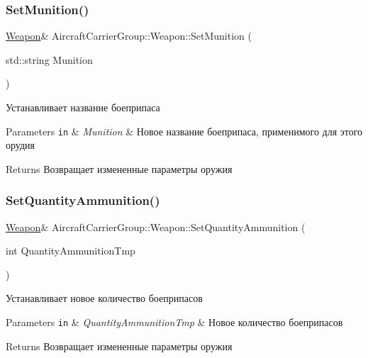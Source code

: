 \subsubsection{\texorpdfstring{Set\+Munition()}{SetMunition()}}
{\footnotesize\ttfamily \mbox{\hyperlink{class_aircraft_carrier_group_1_1_weapon}{Weapon}}\& Aircraft\+Carrier\+Group\+::\+Weapon\+::\+Set\+Munition (\begin{DoxyParamCaption}\item[{std\+::string}]{Munition }\end{DoxyParamCaption})\hspace{0.3cm}{\ttfamily [inline]}}



Устанавливает название боеприпаса 


\begin{DoxyParams}[1]{Parameters}
\mbox{\tt in}  & {\em Munition} & Новое название боеприпаса, применимого для этого орудия \\
\hline
\end{DoxyParams}
\begin{DoxyReturn}{Returns}
Возвращает измененные параметры оружия 
\end{DoxyReturn}
\mbox{\label{class_aircraft_carrier_group_1_1_weapon_a9fd2fbb263336abbbc9d12c51a9de3c1}} 
\subsubsection{\texorpdfstring{Set\+Quantity\+Ammunition()}{SetQuantityAmmunition()}}
{\footnotesize\ttfamily \mbox{\hyperlink{class_aircraft_carrier_group_1_1_weapon}{Weapon}}\& Aircraft\+Carrier\+Group\+::\+Weapon\+::\+Set\+Quantity\+Ammunition (\begin{DoxyParamCaption}\item[{int}]{Quantity\+Ammunition\+Tmp }\end{DoxyParamCaption})\hspace{0.3cm}{\ttfamily [inline]}}



Устанавливает новое количество боеприпасов 


\begin{DoxyParams}[1]{Parameters}
\mbox{\tt in}  & {\em Quantity\+Ammunition\+Tmp} & Новое количество боеприпасов \\
\hline
\end{DoxyParams}
\begin{DoxyReturn}{Returns}
Возвращает измененные параметры оружия 
\end{DoxyReturn}
\mbox{\label{class_aircraft_carrier_group_1_1_weapon_a8f83ea62a85411992eb53634fc43b011}} 
